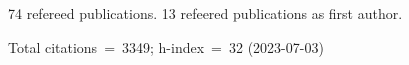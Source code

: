 74 refereed publications. 13 refeered publications as first author.

Total citations~=~3349; h-index~=~32 (2023-07-03)